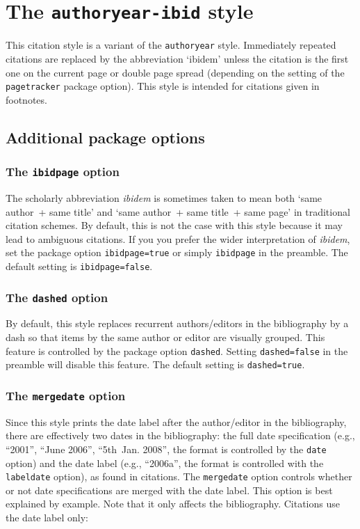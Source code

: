 \documentclass[a4paper]{article}
\begin{document}
\section*{The \texttt{authoryear-ibid} style}

This citation style is a variant of the \texttt{authoryear} style.
Immediately repeated citations are replaced by the abbreviation
`ibidem' unless the citation is the first one on the current page or
double page spread (depending on the setting of the
\texttt{pagetracker} package option). This style is intended for
citations given in footnotes.

\subsection*{Additional package options}

\subsubsection*{The \texttt{ibidpage} option}

The scholarly abbreviation \emph{ibidem} is sometimes taken to mean
both `same author~+ same title' and `same author~+ same title~+ same
page' in traditional citation schemes. By default, this is not the
case with this style because it may lead to ambiguous citations. If
you you prefer the wider interpretation of \emph{ibidem}, set the
package option \texttt{ibidpage=true} or simply \texttt{ibidpage} in
the preamble. The default setting is \texttt{ibidpage=false}.

\subsubsection*{The \texttt{dashed} option}

By default, this style replaces recurrent authors/editors in the
bibliography by a dash so that items by the same author or editor
are visually grouped. This feature is controlled by the package
option \texttt{dashed}. Setting \texttt{dashed=false} in the
preamble will disable this feature. The default setting is
\texttt{dashed=true}.

\subsubsection*{The \texttt{mergedate} option}

Since this style prints the date label after the author/editor in the
bibliography, there are effectively two dates in the bibliography:
the full date specification (e.g., \enquote{2001}, \enquote{June
2006}, \enquote{5th~Jan. 2008}, the format is controlled by the
\texttt{date} option) and the date label (e.g., \enquote{2006a},
the format is controlled with the \texttt{labeldate} option),
as found in citations. The \texttt{mergedate} option controls whether
or not date specifications are merged with the date label.
This option is best explained by example. Note that
it only affects the bibliography. Citations use the date label only:
\end{document}
